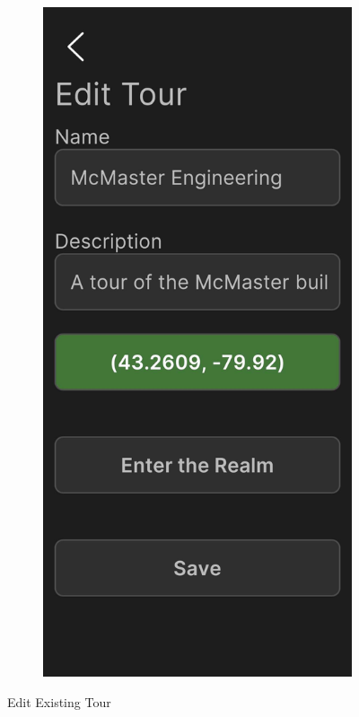 \documentclass[12pt, titlepage]{article}
\begin{document}
\begin{figure}[ht!]
\begin{subfigure}[b]{0.48\textwidth}
    \end{subfigure}
    \hfill
    \begin{subfigure}[b]{0.48\textwidth}
        \centering
        \includegraphics[width=\textwidth]{edit_tour.png}
    \end{subfigure}
    \caption{Edit Existing Tour}
    \label{fig:edit_tour}
\end{figure}
\end{document}
